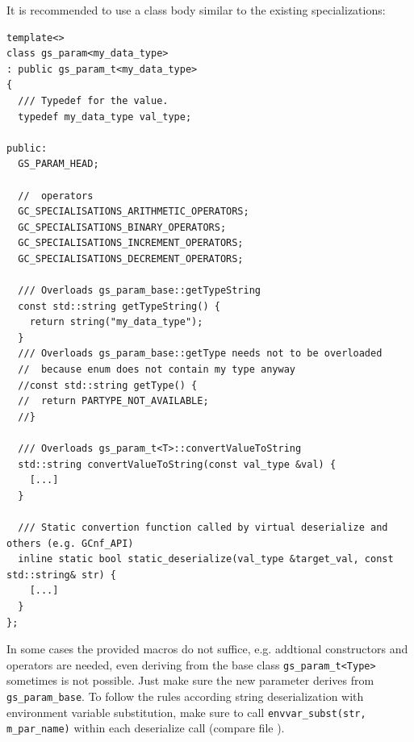 It is recommended to use a class body similar to the existing specializations:
\begin{lstlisting}
template<>
class gs_param<my_data_type>
: public gs_param_t<my_data_type>
{
  /// Typedef for the value.
  typedef my_data_type val_type;

public:
  GS_PARAM_HEAD;

  //  operators
  GC_SPECIALISATIONS_ARITHMETIC_OPERATORS;
  GC_SPECIALISATIONS_BINARY_OPERATORS;
  GC_SPECIALISATIONS_INCREMENT_OPERATORS;
  GC_SPECIALISATIONS_DECREMENT_OPERATORS;

  /// Overloads gs_param_base::getTypeString
  const std::string getTypeString() {
    return string("my_data_type");
  }
  /// Overloads gs_param_base::getType needs not to be overloaded
  //  because enum does not contain my type anyway
  //const std::string getType() {
  //  return PARTYPE_NOT_AVAILABLE;
  //}

  /// Overloads gs_param_t<T>::convertValueToString
  std::string convertValueToString(const val_type &val) {
    [...]
  }

  /// Static convertion function called by virtual deserialize and others (e.g. GCnf_API)
  inline static bool static_deserialize(val_type &target_val, const std::string& str) {
    [...]
  }
};
\end{lstlisting}

In some cases the provided macros do not suffice, e.g. addtional constructors and operators are needed, even deriving from the base class \lstinline|gs_param_t<Type>| sometimes is not possible. Just make sure the new parameter derives from \lstinline|gs_param_base|. To follow the rules according string deserialization with environment variable substitution, make sure to call \lstinline|envvar_subst(str, m_par_name)| within each deserialize call (compare file ).

